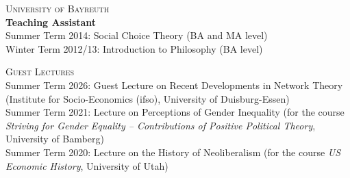 \documentclass[margin]{res}
\begin{document}
\begin{resume}
	\textsc{University of Bayreuth}\\
	\textbf{Teaching Assistant} \\
	Summer Term 2014: Social Choice Theory (BA and MA level)\\
	Winter Term 2012/13: Introduction to Philosophy (BA level)
	
	\newpage
	\textsc{Guest Lectures} \\ 
	Summer Term 2026: Guest Lecture on Recent Developments in Network Theory (Institute for Socio-Economics (ifso), University of Duisburg-Essen)\\

	Summer Term 2021: Lecture on Perceptions of Gender Inequality (for the course \textit{Striving for Gender Equality -- Contributions of Positive Political Theory}, University of Bamberg)\\
	
	Summer Term 2020: Lecture on the History of Neoliberalism (for the course \textit{US Economic History}, University of Utah)\\


\end{resume}
\end{document}
